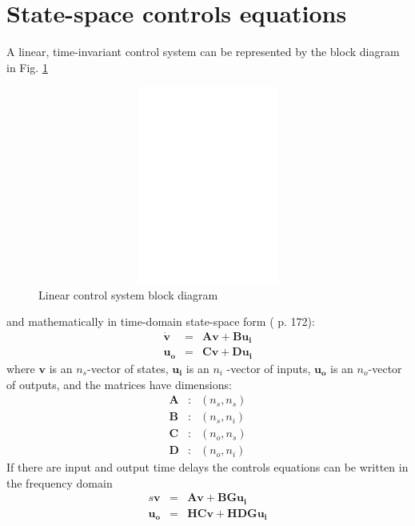 \documentclass[11pt,openany,twoside]{book}
\numberwithin{equation}{section}		%
\newcommand{\Matrix}[1]{\boldsymbol{#1}}
\newcommand{\Vector}[1]{\boldsymbol{#1}}
\newcommand{\Figref}[1]{Fig. \ref{#1}}  %
\begin{document}
\section{State-space controls equations}\label{sect:abcd-conversion}
A linear, time-invariant control system can be represented by the
block diagram in \Figref{fig:abcd-block}
\begin{figure}[ht]
		\includegraphics[height=6.5cm,width=12cm]{lti-block.eps}
	\centering
	\caption{Linear control system block diagram}\label{fig:abcd-block}
\end{figure}
and mathematically in time-domain state-space form
(\cite{brogan1982modern} p. 172):
\begin{eqnarray}
\dot{\Vector{v}} &=& \Vector{Av} + \Vector{Bu_i} 	\nonumber \\
\Vector{u_o} &=& \Vector{Cv} + \Vector{Du_i}	\nonumber
\end{eqnarray}
where $\Vector{v}$ is an $n_s$-vector of states, $\Vector{u_i}$
is an $n_i$ -vector of inputs, $\Vector{u_o}$ is an $n_o$-vector of outputs,
and the matrices have dimensions:
\begin{eqnarray*}
\Matrix{A} & : & (n_s, n_s) \\
\Matrix{B} & : & (n_s, n_i) \\
\Matrix{C} & : & (n_o, n_s) \\
\Matrix{D} & : & (n_o, n_i)
\end{eqnarray*}
If there are input and output time delays the controls equations can be written
in the frequency domain
\begin{eqnarray}\label{eqn:abcd1}
s\Vector{v} &=& \Vector{Av} + \Vector{BGu_i} \\
\Vector{u_o} &=& \Vector{HCv} + \Vector{HDGu_i} \label{eqn:abcd2}
\end{eqnarray}
\end{document}
